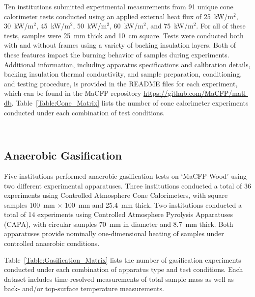 \documentclass{book}
\begin{document}
Ten institutions submitted experimental measurements from 91 unique cone calorimeter tests conducted using an applied external heat flux of 25~kW/m$^2$, 30~kW/m$^2$, 45~kW/m$^2$, 50~kW/m$^2$, 60~kW/m$^2$, and 75~kW/m$^2$. For all of these tests, samples were 25~mm thick and 10~cm square. Tests were conducted both with and without frames using a variety of backing insulation layers. Both of these features impact the burning behavior of samples during experiments. Additional information, including apparatus specifications and calibration details, backing insulation thermal conductivity, and sample preparation, conditioning, and testing procedure, is provided in the README files for each experiment, which can be found in the MaCFP repository \href{https://github.com/MaCFP/matl-db}{https://github.com/MaCFP/matl-db}. Table~\ref{Table:Cone_Matrix} lists the number of cone calorimeter experiments conducted under each combination of test conditions.

\begin{table}[ht]
\caption{Test Matrix of Cone Calorimeter Experiments; table values indicate the number of tests conducted under the listed test conditions, reported as parallel/perpendicular grain orientations}
\label{Table:Cone_Matrix}
\begin{center}
	\\
\end{center}
\end{table}

\subsection{Anaerobic Gasification}
\label{g_tests_gasification}
Five institutions performed anaerobic gasification tests on `MaCFP-Wood' using two different experimental apparatuses. Three institutions conducted a total of 36 experiments using Controlled Atmosphere Cone Calorimeters, with square samples 100~mm $\times$ 100~mm and 25.4~mm thick. Two institutions conducted a total of 14 experiments using Controlled Atmosphere Pyrolysis Apparatuses (CAPA), with circular samples 70~mm in diameter and 8.7~mm thick. Both apparatuses provide nominally one-dimensional heating of samples under controlled anaerobic conditions.

Table~\ref{Table:Gasification_Matrix} lists the number of gasification experiments conducted under each combination of apparatus type and test conditions. Each dataset includes time-resolved measurements of total sample mass as well as back- and/or top-surface temperature measurements.
\end{document}
